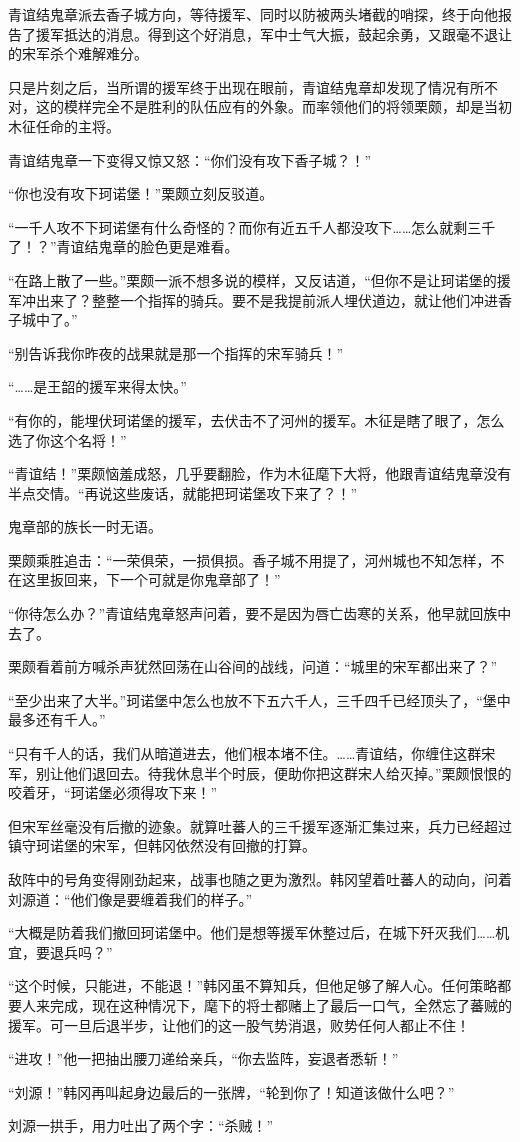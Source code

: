 青谊结鬼章派去香子城方向，等待援军、同时以防被两头堵截的哨探，终于向他报告了援军抵达的消息。得到这个好消息，军中士气大振，鼓起余勇，又跟毫不退让的宋军杀个难解难分。

只是片刻之后，当所谓的援军终于出现在眼前，青谊结鬼章却发现了情况有所不对，这的模样完全不是胜利的队伍应有的外象。而率领他们的将领栗颇，却是当初木征任命的主将。

青谊结鬼章一下变得又惊又怒：“你们没有攻下香子城？！”

“你也没有攻下珂诺堡！”栗颇立刻反驳道。

“一千人攻不下珂诺堡有什么奇怪的？而你有近五千人都没攻下……怎么就剩三千了！？”青谊结鬼章的脸色更是难看。

“在路上散了一些。”栗颇一派不想多说的模样，又反诘道，“但你不是让珂诺堡的援军冲出来了？整整一个指挥的骑兵。要不是我提前派人埋伏道边，就让他们冲进香子城中了。”

“别告诉我你昨夜的战果就是那一个指挥的宋军骑兵！”

“……是王韶的援军来得太快。”

“有你的，能埋伏珂诺堡的援军，去伏击不了河州的援军。木征是瞎了眼了，怎么选了你这个名将！”

“青谊结！”栗颇恼羞成怒，几乎要翻脸，作为木征麾下大将，他跟青谊结鬼章没有半点交情。“再说这些废话，就能把珂诺堡攻下来了？！”

鬼章部的族长一时无语。

栗颇乘胜追击：“一荣俱荣，一损俱损。香子城不用提了，河州城也不知怎样，不在这里扳回来，下一个可就是你鬼章部了！”

“你待怎么办？”青谊结鬼章怒声问着，要不是因为唇亡齿寒的关系，他早就回族中去了。

栗颇看着前方喊杀声犹然回荡在山谷间的战线，问道：“城里的宋军都出来了？”

“至少出来了大半。”珂诺堡中怎么也放不下五六千人，三千四千已经顶头了，“堡中最多还有千人。”

“只有千人的话，我们从暗道进去，他们根本堵不住。……青谊结，你缠住这群宋军，别让他们退回去。待我休息半个时辰，便助你把这群宋人给灭掉。”栗颇恨恨的咬着牙，“珂诺堡必须得攻下来！”

但宋军丝毫没有后撤的迹象。就算吐蕃人的三千援军逐渐汇集过来，兵力已经超过镇守珂诺堡的宋军，但韩冈依然没有回撤的打算。

敌阵中的号角变得刚劲起来，战事也随之更为激烈。韩冈望着吐蕃人的动向，问着刘源道：“他们像是要缠着我们的样子。”

“大概是防着我们撤回珂诺堡中。他们是想等援军休整过后，在城下歼灭我们……机宜，要退兵吗？”

“这个时候，只能进，不能退！”韩冈虽不算知兵，但他足够了解人心。任何策略都要人来完成，现在这种情况下，麾下的将士都赌上了最后一口气，全然忘了蕃贼的援军。可一旦后退半步，让他们的这一股气势消退，败势任何人都止不住！

“进攻！”他一把抽出腰刀递给亲兵，“你去监阵，妄退者悉斩！”

“刘源！”韩冈再叫起身边最后的一张牌，“轮到你了！知道该做什么吧？”

刘源一拱手，用力吐出了两个字：“杀贼！”

